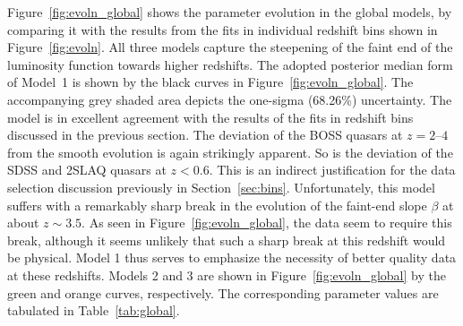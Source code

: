 \documentclass[fleqn,usenatbib]{mnras}
\begin{document}
Figure~\ref{fig:evoln_global} shows the parameter evolution in the
global models, by comparing it with the results from the fits in
individual redshift bins shown in Figure~\ref{fig:evoln}.  All three
models capture the steepening of the faint end of the luminosity
function towards higher redshifts.  The adopted posterior median form
of Model~1 is shown by the black curves in
Figure~\ref{fig:evoln_global}.  The accompanying grey shaded area
depicts the one-sigma (68.26\%) uncertainty.  The model is in
excellent agreement with the results of the fits in redshift bins
discussed in the previous section.
The
deviation of the BOSS quasars at $z=2$--$4$ from the smooth evolution
is again strikingly apparent.  So is
the deviation of the SDSS and
2SLAQ quasars at $z<0.6$.  This is an indirect justification for the
data selection discussion previously in Section~\ref{sec:bins}.
Unfortunately, this model suffers
with a remarkably sharp break in the
evolution of the faint-end slope $\beta$ at about $z\sim 3.5$.  As
seen in Figure~\ref{fig:evoln_global}, the data seem to require this
break, although it seems unlikely that such a sharp break at this
redshift would be physical.  Model 1 thus serves to emphasize the
necessity of better quality data at these redshifts.  Models 2 and 3
are shown in Figure~\ref{fig:evoln_global} by the green and orange
curves, respectively.  The corresponding parameter values are
tabulated in Table~\ref{tab:global}.
\end{document}
